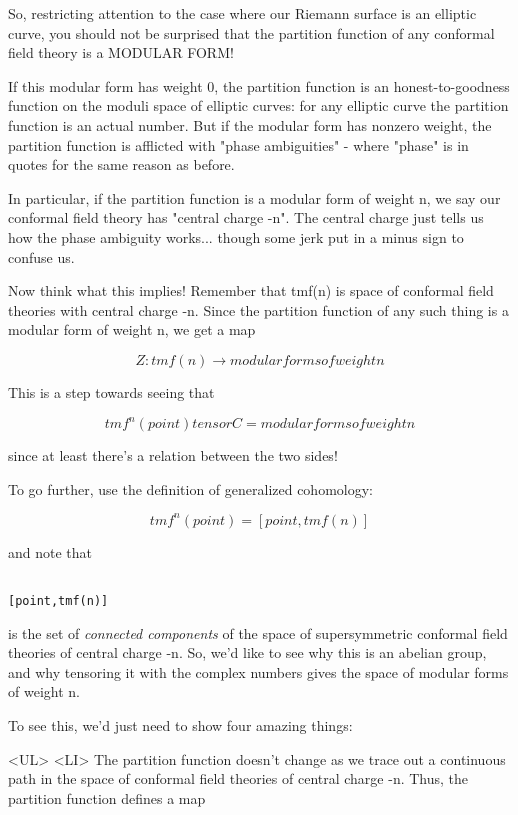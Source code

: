 So, restricting attention to the case where our Riemann surface
is an elliptic curve, you should not be surprised that the 
partition function of any conformal field theory is a MODULAR FORM!  

If this modular form has weight 0, the partition function is an 
honest-to-goodness function on the moduli space of elliptic curves: 
for any elliptic curve the partition function is an actual number.  
But if the modular form has nonzero weight, the partition function 
is afflicted with "phase ambiguities" - where "phase" 
is in quotes for the same reason as before.  

In particular, if the partition function is a modular form
of weight n, we say our conformal field theory has "central
charge -n".  The central charge just tells us how the phase
ambiguity works... though some jerk put in a minus sign to confuse us.  

Now think what this implies!   Remember that tmf(n) is space 
of conformal field theories with central charge -n.  Since
the partition function of any such thing is a modular form of
weight n, we get a map


$$

Z: tmf(n) \to  {modular forms of weight n}
$$
    
This is a step towards seeing that 


$$

tmf^{n}(point) tensor C = {modular forms of weight n} 
$$
    
since at least there's a relation between the two sides!

To go further, use the definition of generalized cohomology:


$$

tmf^{n}(point) = [point,tmf(n)]
$$
    
and note that
 

\begin{verbatim}

[point,tmf(n)] 
\end{verbatim}
    
is the set of \emph{connected components} of the space of supersymmetric
conformal field theories of central charge -n.  So, we'd like to 
see why this is an abelian group, and why tensoring it with
the complex numbers gives the space of modular forms of weight n.

To see this, we'd just need to show four amazing things:

<UL>
<LI> The partition function doesn't change as we trace out
a continuous path in the space of conformal field theories
of central charge -n.  Thus, the partition function defines
a map


